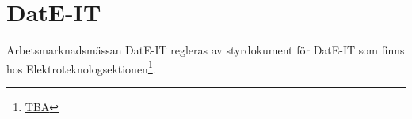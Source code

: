 \section{DatE-IT}
Arbetsmarknadsmässan DatE-IT regleras av styrdokument för DatE-IT som finns
hos Elektroteknologsektionen\footnote{\url{TBA}}. 

